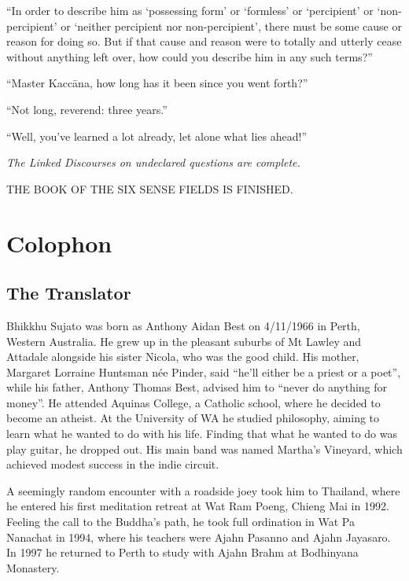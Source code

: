 \documentclass[12pt,openany]{book}%
\newcommand*{\scendsutta}[1]{\begin{center}\textit{#1}\end{center}}
\newcommand*{\scendbook}[1]{\begin{center}\uppercase{#1}\end{center}}
\let\oldbackmatter\backmatter
\renewcommand{\backmatter}{%
\chapterfont{\setstretch{.85}\normalfont\centering}%
\sectionfont{\setstretch{.85}\Semiboldsubheadfont}%
\oldbackmatter}
\begin{document}
“In order to describe him as ‘possessing form’ or ‘formless’ or ‘percipient’ or ‘non-percipient’ or ‘neither percipient nor non-percipient’, there must be some cause or reason for doing so. But if that cause and reason were to totally and utterly cease without anything left over, how could you describe him in any such terms?” 

“Master \textsanskrit{Kaccāna}, how long has it been since you went forth?” 

“Not long, reverend: three years.” 

“Well, you’ve learned a lot already, let alone what lies ahead!” 

\scendsutta{The Linked Discourses on undeclared questions are complete. }

\scendbook{The Book of the Six Sense Fields is finished. }

%
\backmatter%
\chapter*{Colophon}

\section*{The Translator}

Bhikkhu Sujato was born as Anthony Aidan Best on 4/11/1966 in Perth, Western Australia. He grew up in the pleasant suburbs of Mt Lawley and Attadale alongside his sister Nicola, who was the good child. His mother, Margaret Lorraine Huntsman née Pinder, said “he’ll either be a priest or a poet”, while his father, Anthony Thomas Best, advised him to “never do anything for money”. He attended Aquinas College, a Catholic school, where he decided to become an atheist. At the University of WA he studied philosophy, aiming to learn what he wanted to do with his life. Finding that what he wanted to do was play guitar, he dropped out. His main band was named Martha’s Vineyard, which achieved modest success in the indie circuit. 

A seemingly random encounter with a roadside joey took him to Thailand, where he entered his first meditation retreat at Wat Ram Poeng, Chieng Mai in 1992. Feeling the call to the Buddha’s path, he took full ordination in Wat Pa Nanachat in 1994, where his teachers were Ajahn Pasanno and Ajahn Jayasaro. In 1997 he returned to Perth to study with Ajahn Brahm at Bodhinyana Monastery. 
\end{document}
